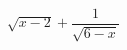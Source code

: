 \hspace*{2mm}\begin{minipage}[t]{\dimexpr\linewidth-2mm\relax}\vspace{0pt}
$\sqrt{x-2}+\dfrac{1}{\sqrt{6-x}}$\end{minipage}
